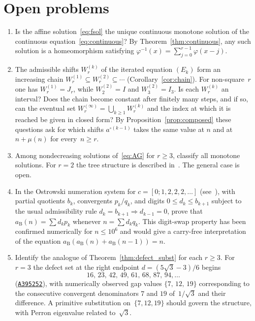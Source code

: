 \documentclass{birkjour}
\theoremstyle{definition}
\theoremstyle{remark}
\begin{document}
\section{Open problems}\label{sec:open}
\begin{enumerate}
\item Is the affine solution~\eqref{eq:fsol}
  the unique continuous
  monotone solution of the continuous
  equation~\eqref{eq:continuous}?
  By Theorem~\ref{thm:continuous}, any such
  solution is a homeomorphism satisfying
  $\varphi^{-1}(x)=\sum_{j=0}^{r-1}\varphi(x{-}j)$.
\item The admissible shifts $W_{r}^{(k)}$ of the iterated
  equation $(E_{k})$ form an increasing chain
  $W_{r}^{(1)}\subseteq W_{r}^{(2)}\subseteq\cdots$
  (Corollary~\ref{cor:chain}). For non-square~$r$ one has
  $W_{r}^{(1)}=J_{r}$, while $W_{2}^{(2)}=I$ and
  $W_{3}^{(2)}=I_{3}$. Is each
  $W_{r}^{(k)}$ an interval? Does the chain become constant
  after finitely many steps, and if so, can the eventual set
  $W_{r}^{(\infty)}=\bigcup_{k\ge 1}W_{r}^{(k)}$ and the index
  at which it is reached be given in closed form? By
  Proposition~\ref{prop:composed} these questions ask for
  which shifts $a^{\circ(k-1)}$ takes the same value at $n$
  and at $n+\mu(n)$ for every~$n\ge r$.
\item Among nondecreasing solutions
  of~\eqref{eq:AG} for $r\ge 3$, classify all
  monotone solutions.  For $r=2$ the tree
  structure is described in~\cite{Cloitre_tree}.
  The general case is open.
\item In the Ostrowski numeration system
  for $c=[0;1,2,2,2,\ldots]$
  (see~\cite{Shallit_book}),
  with partial quotients $b_{k}$, convergents $p_{k}/q_{k}$,
  and digits $0\le d_{k}\le b_{k+1}$ subject to the usual
  admissibility rule $d_{k}=b_{k+1}\Rightarrow d_{k-1}=0$,
  prove that
  $a_{\mathrm{B}}(n)=\sum d_{k}p_{k}$
  whenever $n=\sum d_{k}q_{k}$.
  This digit-swap property has been
  confirmed numerically for $n\le 10^{6}$
  and would give a carry-free interpretation
  of the equation
  $a_{\mathrm{B}}(a_{\mathrm{B}}(n)+a_{\mathrm{B}}(n{-}1))=n$.
\item Identify the analogue of
  Theorem~\ref{thm:defect_subst} for each
  $r\ge 3$. For $r=3$ the defect set at the
  right endpoint $d=(5\sqrt{3}{-}3)/6$ begins
\[
  16,\,23,\,42,\,49,\,61,\,68,\,87,\,94,\ldots
\]
  (\href{https://oeis.org/A395252}{\texttt{A395252}}), with
  numerically observed gap
  values $\{7,\,12,\,19\}$ corresponding to the
  consecutive convergent denominators $7$ and
  $19$ of~$1/\!\sqrt{3}$ and their difference.
  A primitive substitution on~$\{7,12,19\}$
  should govern the structure, with Perron
  eigenvalue related to~$\sqrt{3}$.
\end{enumerate}
\end{document}
